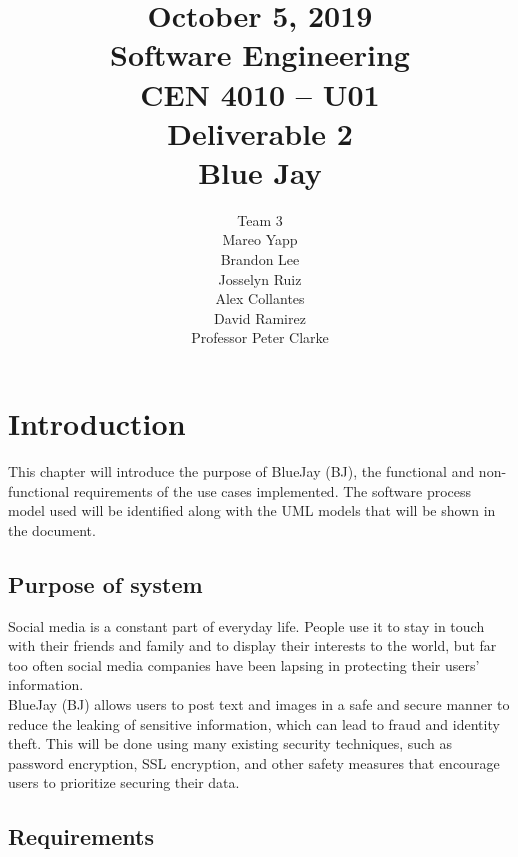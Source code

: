 \documentclass{report}
\begin{document}
\title{October 5, 2019\\Software Engineering\\CEN 4010 – U01\\Deliverable 2\\Blue Jay}

\author{Team 3\\Mareo Yapp\\Brandon Lee\\Josselyn Ruiz\\Alex Collantes\\David Ramirez\\Professor Peter Clarke}
\maketitle

\begin{abstract}

\end{abstract}
 
\tableofcontents

\chapter{Introduction}
	This chapter will introduce the purpose of BlueJay (BJ), the functional and non-functional requirements of the use cases implemented. The software process model used will be identified along with the UML models that will be shown in the document.
\section{Purpose of system}
	Social media is a constant part of everyday life. People use it to stay in touch with their friends and family and to display their interests to the world, but far too often social media companies have been lapsing in protecting their users’ information.\\
	BlueJay (BJ) allows users to post text and images in a safe and secure manner to reduce the leaking of sensitive information, which can lead to fraud and identity theft. This will be done using many existing security techniques, such as password encryption, SSL encryption, and other safety measures that encourage users to prioritize securing their data.
\section{Requirements}
\end{document}
